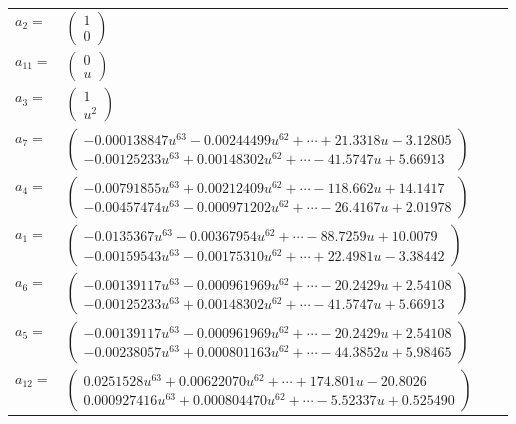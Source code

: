 \documentclass[1p]{elsarticle_modified}
\theoremstyle{definition}
\begin{document}
\begin{tabular}{m{7pt} m{180pt} m{7pt} m{180pt} }
\flushright $a_{2}=$&$\begin{pmatrix}1\\0\end{pmatrix}$ \\
\flushright $a_{11}=$&$\begin{pmatrix}0\\u\end{pmatrix}$ \\
\flushright $a_{3}=$&$\begin{pmatrix}1\\u^2\end{pmatrix}$ \\
\flushright $a_{7}=$&$\begin{pmatrix}-0.000138847 u^{63}-0.00244499 u^{62}+\cdots+21.3318 u-3.12805\\-0.00125233 u^{63}+0.00148302 u^{62}+\cdots-41.5747 u+5.66913\end{pmatrix}$ \\
\flushright $a_{4}=$&$\begin{pmatrix}-0.00791855 u^{63}+0.00212409 u^{62}+\cdots-118.662 u+14.1417\\-0.00457474 u^{63}-0.000971202 u^{62}+\cdots-26.4167 u+2.01978\end{pmatrix}$ \\
\flushright $a_{1}=$&$\begin{pmatrix}-0.0135367 u^{63}-0.00367954 u^{62}+\cdots-88.7259 u+10.0079\\-0.00159543 u^{63}-0.00175310 u^{62}+\cdots+22.4981 u-3.38442\end{pmatrix}$ \\
\flushright $a_{6}=$&$\begin{pmatrix}-0.00139117 u^{63}-0.000961969 u^{62}+\cdots-20.2429 u+2.54108\\-0.00125233 u^{63}+0.00148302 u^{62}+\cdots-41.5747 u+5.66913\end{pmatrix}$ \\
\flushright $a_{5}=$&$\begin{pmatrix}-0.00139117 u^{63}-0.000961969 u^{62}+\cdots-20.2429 u+2.54108\\-0.00238057 u^{63}+0.000801163 u^{62}+\cdots-44.3852 u+5.98465\end{pmatrix}$ \\
\flushright $a_{12}=$&$\begin{pmatrix}0.0251528 u^{63}+0.00622070 u^{62}+\cdots+174.801 u-20.8026\\0.000927416 u^{63}+0.000804470 u^{62}+\cdots-5.52337 u+0.525490\end{pmatrix}$ \\

\end{tabular}
\end{document}
